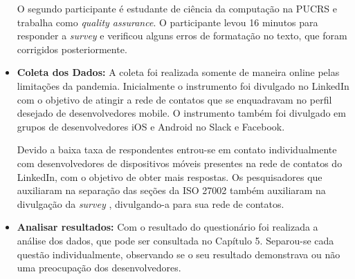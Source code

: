 \begin{itemize}
 O segundo participante é estudante de ciência da computação na PUCRS e trabalha como \textit{quality assurance}. O participante levou 16 minutos para responder a \textit{survey} e verificou alguns erros de formatação no texto, que foram corrigidos posteriormente.  
 

\item \textbf{Coleta dos Dados:} A coleta foi realizada somente de maneira online pelas limitações da pandemia. Inicialmente o instrumento foi divulgado no LinkedIn com o objetivo de atingir a rede de contatos que se enquadravam no perfil desejado de desenvolvedores mobile. O instrumento também foi divulgado em grupos de desenvolvedores iOS e Android no Slack e Facebook. 

Devido a baixa taxa de respondentes entrou-se em contato individualmente com desenvolvedores de dispositivos móveis presentes na rede de contatos do LinkedIn, com o objetivo de obter mais respostas. Os pesquisadores que auxiliaram na separação das seções da ISO 27002 também auxiliaram na divulgação da \textit{survey} , divulgando-a para sua rede de contatos. 


\item \textbf{Analisar resultados:} Com o resultado do questionário foi realizada a análise dos dados, que pode ser consultada no Capítulo 5. Separou-se cada questão individualmente, observando se o seu resultado demonstrava ou não uma preocupação dos desenvolvedores.
\end{itemize}





